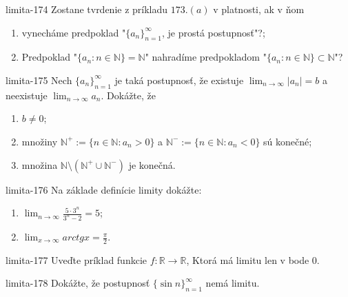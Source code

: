 \begin{defproblem}{limita-174}
Zostane tvrdenie z príkladu $173.(a)$  v platnosti, ak v ňom
\begin{enumerate}
\item vynecháme predpoklad "${\{a_n\}}_{n=1}^\infty$, je prostá postupnosť"?;
\item Predpoklad "$\{a_n: n \in \mathbb{N}\}=\mathbb{N}$" nahradíme predpokladom "$\{a_n: n \in \mathbb{N}\} \subset \mathbb{N}$"?
\end{enumerate}
\end{defproblem}

\begin{defproblem}{limita-175}
Nech ${\{a_n\}}_{n=1}^\infty$ je taká postupnosť, že existuje $\lim_{n \rightarrow \infty} |a_n|=b$ a neexistuje $\lim_{n \rightarrow \infty} a_n$. Dokážte, že
\begin{enumerate}
\item $b \neq 0$;
\item množiny $\mathbb{N^+}:= \{n \in \mathbb{N}: a_n>0 \}$ a $\mathbb{N^-}:= \{n \in \mathbb{N}: a_n<0 \}$ sú konečné;
\item množina $\mathbb{N} \setminus (\mathbb{N^+} \cup \mathbb{N^-})$ je konečná.
\end{enumerate}
\end{defproblem}

\begin{defproblem}{limita-176}
Na základe definície limity dokážte:
\begin{multicols}{2}
\begin{enumerate}
    \item $\lim_{n \rightarrow \infty} \frac{5 \cdot 3^n}{3^n-2}=5$;
    \item $\lim_{x \rightarrow \infty} arctg x=\frac{\pi}{2}$.
\end{enumerate}
\end{multicols}
\end{defproblem}

\begin{defproblem}{limita-177}
Uveďte príklad funkcie $f: \mathbb{R} \rightarrow \mathbb{R}$, Ktorá má limitu len v bode $0$.
\end{defproblem}

\begin{defproblem}{limita-178}
Dokážte, že postupnosť ${\{\sin n\}}_{n=1}^\infty$ nemá limitu.
\end{defproblem}

